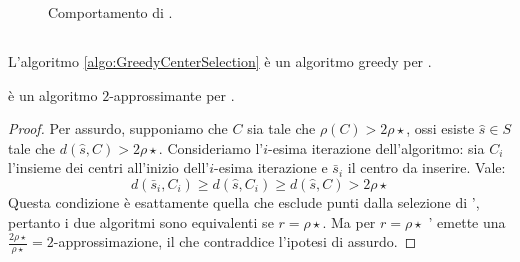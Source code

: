 \begin{figure}[ht]
	\centering
	
	\caption{Comportamento di \CenterSelectionPlus.}
	\label{fig:csplus_r_beh}
\end{figure}


\subsection{\GreedyCenterSelection}
L'algoritmo \ref{algo:GreedyCenterSelection} è un algoritmo greedy per \CenterSelection.

\begin{algorithm}
	\caption{\GreedyCenterSelection}
	
	\label{algo:GreedyCenterSelection}
\end{algorithm}

\begin{theorem}
	\GreedyCenterSelection è un algoritmo $2$-approssimante per \CenterSelection.
\end{theorem}
\begin{proof}
	Per assurdo, supponiamo che $C$ sia tale che $\rho(C)>2\rho\star$, ossi  esiste $\hat s\in S$ tale che $d(\hat s,C)> 2\rho\star$.
	Consideriamo l'$i$-esima iterazione dell'algoritmo: sia $C_i$ l'insieme dei centri all'inizio dell'$i$-esima iterazione e $\bar s_i$ il centro da inserire. Vale:
	\begin{equation*}
		d(\bar s_i,C_i)\geq d(\hat s,C_i)\geq d(\hat s, C)>2\rho\star
	\end{equation*}
	Questa condizione è esattamente quella che esclude punti dalla selezione di \CenterSelectionPlus', pertanto i due algoritmi sono equivalenti se $r=\rho\star$. Ma per $r=\rho\star$ \CenterSelectionPlus' emette una $\frac{2\rho\star}{\rho\star}=2$-approssimazione, il che contraddice l'ipotesi di assurdo.
\end{proof}

